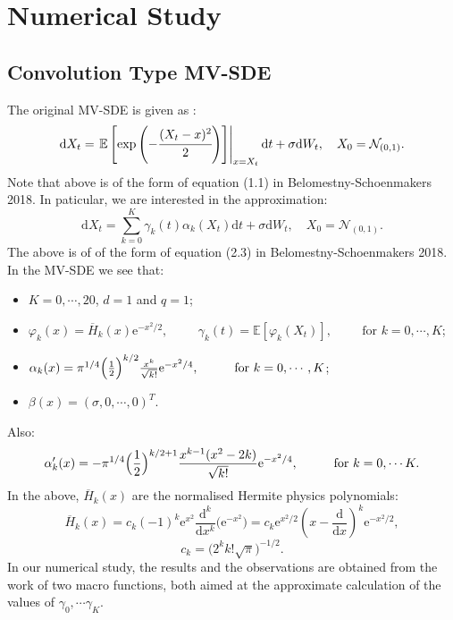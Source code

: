 \documentclass[a4paper,11pt,openright]{report}
\begin{document}
\chapter*{Numerical Study}

\section{Convolution Type MV-SDE}
The original MV-SDE is given as :
\[
\textrm{d} X_t = \left. \mathbb{E}\left[\exp\left(-\cfrac{(X_t- x)^2}{2}\right)\right]\right|_{x=X_t}  \textrm{d} t +  \sigma \textrm{d} W_t, \quad X_0 = \mathcal{N}_{(0,1)}.
\]
Note that above is of the form of equation (1.1) in Belomestny-Schoenmakers 2018. In paticular, we are interested in the approximation:
$$ \textrm{d} X_t = \sum^K_{k=0}\gamma_k(t) \alpha_k(X_t) \textrm{d} t +  \sigma \textrm{d} W_t, \quad X_0 = \mathcal{N}_{(0,1)}. $$
The above is of of the form of equation (2.3) in Belomestny-Schoenmakers 2018.
In the MV-SDE we see that:
\begin{itemize}
\item $K = 0, \cdots, 20$, $d = 1$ and $q = 1$;
\item $ \varphi_k(x) = \overline{H}_k(x) \mathrm{e}^{-x^2/2}, \hspace{1cm} \gamma_k(t) = \mathbb {E}[\varphi_k(X_t)], \hspace{1cm} \mbox{for } k = 0, \cdots, K$; 
\item $ \alpha_k(x) = \pi^{1/4}\Bigl( \frac{1}{2}\Bigr)^{k/2} \frac{x^k}{\sqrt{k!}} \mathrm{e}^{-x^2/4}, \hspace{1cm} \mbox{for } k = 0, \cdots, K$; 
\item $ \beta(x)=(\sigma, 0, \cdots, 0)^T $.
\end{itemize}
Also:
\[
\alpha'_k(x) = -\pi^{1/4}\Bigl( \frac{1}{2}\Bigr)^{k/2+1} \frac{x^{k-1}  (x^2-2k) }{\sqrt{k!}} \mathrm{e}^{-x^2/4}, \hspace{1cm} \mbox{for } k = 0, \cdots K.
\]
In the above, $\overline{H}_k(x)$ are the normalised Hermite physics polynomials:
\[
\overline{H}_k(x) = c_k (-1)^k \mathrm{e}^{x^2} \frac{\mathrm{d}^k}{\mathrm{d} x^k} \bigl( \mathrm{e}^{-x^2}\bigr) =  c_k \mathrm{e}^{x^2/2} \left( x - \frac{\mathrm{d}}{\mathrm{d} x} \right) ^k \mathrm{e}^{-x^2/2},
\]
\[
c_k = \bigl(2^k k! \sqrt{\pi} \bigr)^{-1/2}.
\]
In our numerical study, the results and the observations are obtained from the work of two macro functions, both aimed at the approximate calculation of the values of $\gamma_0, \cdots \gamma_K$.
\end{document}
